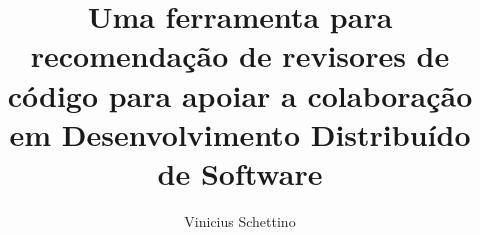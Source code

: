 \documentclass[preprint,review, 12pt]{elsarticle}
\title{Uma ferramenta para recomendação de revisores de código para apoiar a colaboração em Desenvolvimento Distribuído de Software}
\author{Vinicius Schettino}
\begin{document}
\begin{frontmatter}

















\end{frontmatter}
\end{document}

